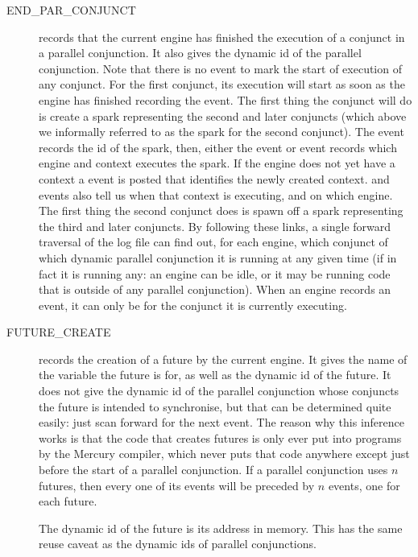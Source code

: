 \begin{description}
\item[END\_PAR\_CONJUNCT]
records that the current engine
has finished the execution of a conjunct in a parallel conjunction.
It also gives the dynamic id of the parallel conjunction.
Note that there is no  event
to mark the start of execution of any conjunct.
For the first conjunct, its execution will start
as soon as the engine has finished recording the
 event.
The first thing the conjunct will do is create a spark
representing the second and later conjuncts
(which above we informally referred to as the spark for the second conjunct).
The  event records the id of the spark,
then, either the  event or  event records
which engine and context executes the spark.
If the engine does not yet have a context a 
event is posted that identifies the newly created context.
 and  events
also tell us when that context is executing, and on which engine.
The first thing the second conjunct does is spawn off a spark
representing the third and later conjuncts.
By following these links,
a single forward traversal of the log file can find out,
for each engine, which conjunct of which dynamic parallel conjunction
it is running at any given time
(if in fact it is running any:
an engine can be idle,
or it may be running code that is outside of any parallel conjunction).
When an engine records an  event,
it can only be for the conjunct it is currently executing.

\item[FUTURE\_CREATE] records the creation of a future by the current
engine.
It gives the name of the variable the future is for,
as well as the dynamic id of the future.
It does not give the dynamic id of the parallel conjunction
whose conjuncts the future is intended to synchronise,
but that can be determined quite easily:
just scan forward for the next 
event.
The reason why this inference works is that
the code that creates futures
is only ever put into programs by the Mercury compiler,
which never puts that code anywhere
except just before the start of a parallel conjunction.
If a parallel conjunction uses $n$ futures,
then every one of its  events
will be preceded by $n$  events,
one for each future.

The dynamic id of the future is its address in memory.
This has the same reuse caveat
as the dynamic ids of parallel conjunctions.


\end{description}

